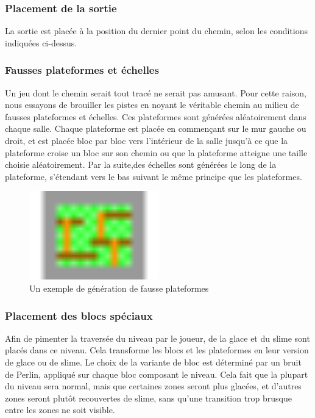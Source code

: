 \documentclass[10pt]{report}
\begin{document}
\subsubsection{Placement de la sortie}

La sortie est placée à la position du dernier point du chemin, selon
les conditions indiquées ci-dessus.

\subsubsection{Fausses plateformes et échelles}

Un jeu dont le chemin serait tout tracé ne serait pas amusant.
Pour cette raison, nous essayons de brouiller les pistes en noyant le
véritable chemin au milieu de fausses plateformes et échelles.
Ces plateformes sont générées aléatoirement dans chaque salle.
Chaque plateforme est placée en commençant sur le mur gauche ou droit,
et est placée bloc par bloc vers l'intérieur de la salle jusqu'à ce
que la plateforme croise un bloc sur son chemin ou
que la plateforme atteigne une taille choisie aléatoirement.
Par la suite,des échelles sont générées le long de la plateforme,
s'étendant vers le bas suivant le même principe que les plateformes.

\begin{figure}[H]
  \centering
  \includegraphics[width=0.5\textwidth]{images/fake_platforms}
  \caption{Un exemple de génération de fausse plateformes}
  \label{fig:fake_platforms}
\end{figure}

\subsubsection{Placement des blocs spéciaux}

Afin de pimenter la traversée du niveau par le joueur, de la glace et du 
slime sont placés dans ce niveau.
Cela transforme les blocs et les plateformes en leur version de glace ou de slime.
Le choix de la variante de bloc est déterminé par un bruit de Perlin, appliqué sur chaque bloc
composant le niveau.
Cela fait que la plupart du niveau sera normal, mais que certaines zones seront plus glacées,
et d'autres zones seront plutôt recouvertes de slime,
sans qu'une transition trop brusque entre les zones ne soit visible.
\end{document}
